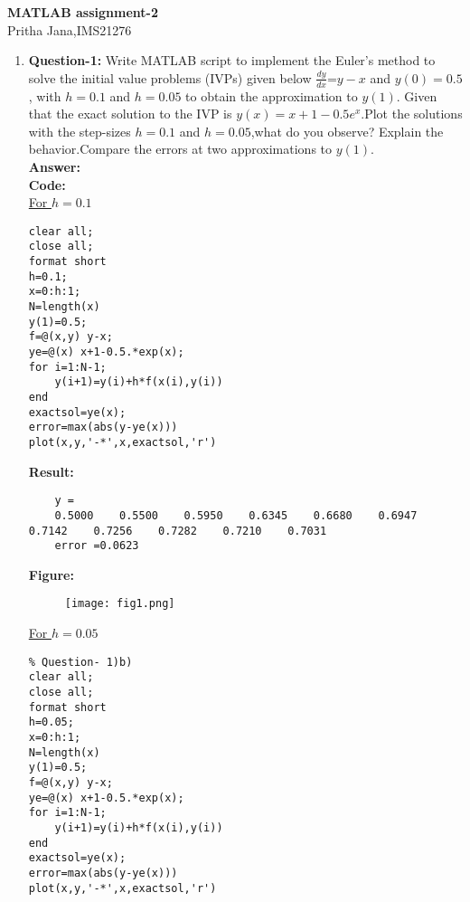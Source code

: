 \documentclass{article}
\begin{document}
\begin{center}
   \textbf{MATLAB assignment-2}\\
   Pritha Jana,IMS21276
    \end{center}
\bigskip
\begin{enumerate}
    \item \textbf{Question-1:} Write MATLAB script to implement the Euler’s method to solve the initial value problems
(IVPs) given below $\frac{dy}{dx}$=$y-x$ and $y(0) = 0.5$,
with $h=0.1$ and $h=0.05$ to obtain the approximation to $y(1)$. Given that the exact solution to the IVP is $y(x) = x+1-0.5e^x$.Plot the solutions with the step-sizes $h = 0.1$ and $h = 0.05$,what do you observe? Explain the behavior.Compare the errors at two approximations to $y(1)$.\\
\textbf{Answer:}\\
\textbf{Code:}\\
\underline{For $h=0.1$}
    \begin{lstlisting}
clear all;
close all;
format short 
h=0.1;
x=0:h:1;
N=length(x)
y(1)=0.5;
f=@(x,y) y-x;
ye=@(x) x+1-0.5.*exp(x);
for i=1:N-1;
    y(i+1)=y(i)+h*f(x(i),y(i))
end
exactsol=ye(x);
error=max(abs(y-ye(x)))
plot(x,y,'-*',x,exactsol,'r')

\end{lstlisting}
\textbf{Result:}
\begin{lstlisting}
    y =
    0.5000    0.5500    0.5950    0.6345    0.6680    0.6947    0.7142    0.7256    0.7282    0.7210    0.7031
    error =0.0623
\end{lstlisting}
\textbf{Figure:}
\begin{figure}[H]                                 
	  \centering                          
	  \texttt{[image: fig1.png]}
\caption{}
\label{fig:1.1}                        
  \end{figure}
\underline{For $h=0.05$}
\begin{lstlisting}
% Question- 1)b)
clear all;
close all;
format short 
h=0.05;
x=0:h:1;
N=length(x)
y(1)=0.5;
f=@(x,y) y-x;
ye=@(x) x+1-0.5.*exp(x);
for i=1:N-1;
    y(i+1)=y(i)+h*f(x(i),y(i))
end
exactsol=ye(x);
error=max(abs(y-ye(x)))
plot(x,y,'-*',x,exactsol,'r')


\end{lstlisting}
\end{enumerate}
\end{document}
